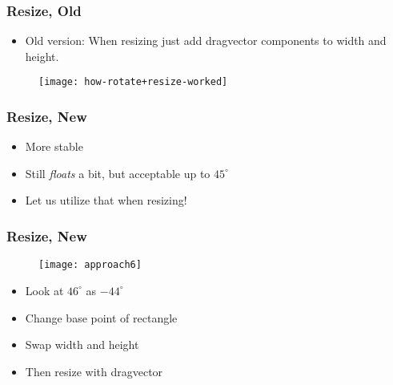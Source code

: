 
\begin{frame}
	\frametitle{Resize, Old}
	\begin{itemize}
		\item Old version: When resizing just add dragvector components to width and height.
		
	\end{itemize}
	\begin{figure}
		\centering
		\texttt{[image: how-rotate+resize-worked]}
	\end{figure}
	\end{frame}
		
		
\begin{frame}
	\frametitle{Resize, New}
	
		\begin{itemize}
			\item More stable
			\item Still \textit{floats} a bit, but acceptable up to $45 ^\circ$
			\item Let us utilize that when resizing!
		\end{itemize}
	
\end{frame}

\begin{frame}
	\frametitle{Resize, New}
			\begin{figure}
			\centering
				\texttt{[image: approach6]}
			\end{figure}
			\begin{itemize}
			\item Look at $46^\circ$ as $-44^\circ$
			\item Change base point of rectangle
			\item Swap width and height
			\item Then resize with dragvector
			\end{itemize}
			
\end{frame}

